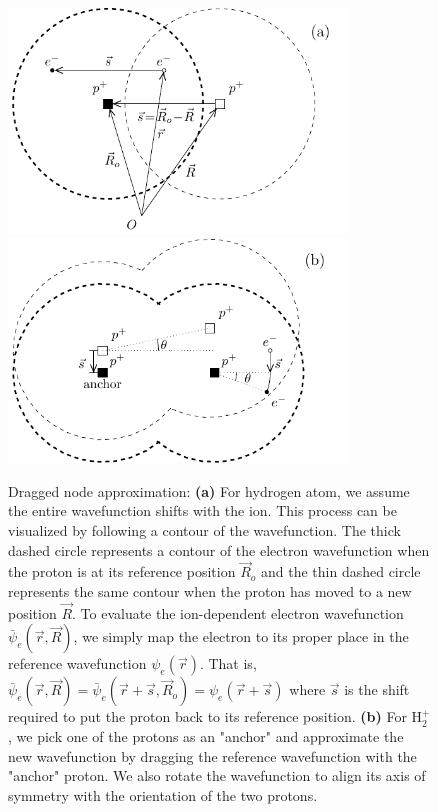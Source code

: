 \documentclass[pra,superscriptaddress,groupedaddress,twocolumn]{revtex4}
\begin{document}
\begin{figure}[t]
\includegraphics[width=9cm]{fig1a.pdf}
\includegraphics[width=9cm]{fig1b.pdf}
\caption{Dragged node approximation: {\bf (a)} For hydrogen atom, we assume the entire wavefunction shifts with the ion. This process can be visualized by following a contour of the wavefunction. The thick dashed circle represents a contour of the electron wavefunction when the proton is at its reference position $\vec{R}_o$ and the thin dashed circle represents the same contour when the proton has moved to a new position $\vec{R}$. To evaluate the ion-dependent electron wavefunction $\bar{\psi}_e(\vec{r},\vec{R})$, we simply map the electron to its proper place in the reference wavefunction $\psi_e(\vec{r})$. That is, $\bar{\psi}_e(\vec{r},\vec{R})=\bar{\psi}_e(\vec{r}+\vec{s},\vec{R}_o)=\psi_e(\vec{r}+\vec{s})$ where $\vec{s}$ is the shift required to put the proton back to its reference position. {\bf (b)} For H$_2^+$, we pick one of the protons as an "anchor" and approximate the new wavefunction by dragging the reference wavefunction with the "anchor" proton. We also rotate the wavefunction to align its axis of symmetry with the orientation of the two protons. \label{fig:drag}}
\end{figure}
\end{document}
